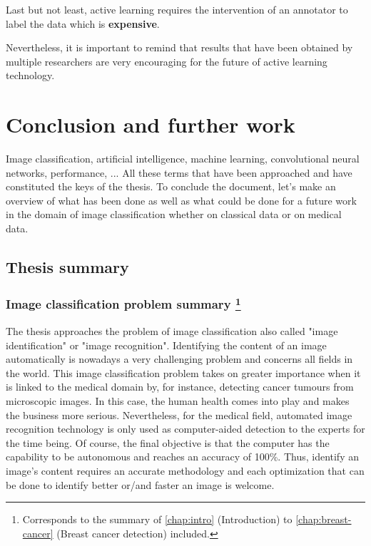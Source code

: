 \documentclass[11pt, openany]{report}
\theoremstyle{plain}
\theoremstyle{definition}
\theoremstyle{remark}
\begin{document}
Last but not least, active learning requires the intervention of an annotator to label the data which is \textbf{expensive}.

Nevertheless, it is important to remind that results that have been obtained by multiple researchers are very encouraging for the future of active learning technology. 




\chapter{Conclusion and further work} \label{chap:conclusion}
Image classification, artificial intelligence, machine learning, convolutional neural networks, performance, ... All these terms that have been approached and have constituted the keys of the thesis. To conclude the document, let's make an overview of what has been done as well as what could be done for a future work in the domain of image classification whether on classical data or on medical data. 


\section{Thesis summary}
\subsection{Image classification problem summary \protect\footnote{Corresponds to the summary of \autoref{chap:intro} (Introduction) to \autoref{chap:breast-cancer} (Breast cancer detection) included.}}
The thesis approaches the problem of image classification also called "image identification" or "image recognition".  Identifying the content of an image automatically is nowadays a very challenging problem and concerns all fields in the world. This image classification problem takes on greater importance when it is linked to the medical domain by, for instance, detecting cancer tumours from microscopic images. In this case, the human health comes into play and makes the business more serious. Nevertheless, for the medical field, automated image recognition technology is only used as computer-aided detection to the experts for the time being. Of course, the final objective is that the computer has the capability to be autonomous and reaches an accuracy of 100\%. Thus, identify an image's content requires an accurate methodology and each optimization that can be done to identify better or/and faster an image is welcome. 
\end{document}
